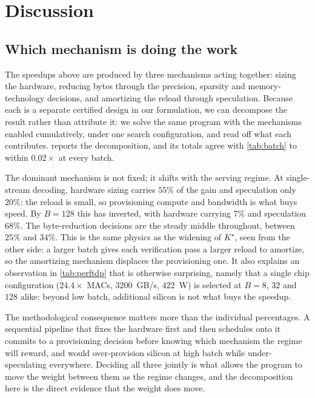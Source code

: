 \section{Discussion}
\label{sec:discussion}

\subsection{Which mechanism is doing the work}
\label{sec:mechanism_shift}

The speedups above are produced by three mechanisms acting together: sizing the
hardware, reducing bytes through the precision, sparsity and memory-technology
decisions, and amortizing the reload through speculation. Because each is a
separate certified design in our formulation, we can decompose the result rather
than attribute it: we solve the same program with the mechanisms enabled
cumulatively, under one search configuration, and read off what each contributes.
 reports the decomposition, and its totals agree with
\cref{tab:batch} to within $0.02\times$ at every batch.

The dominant mechanism is not fixed; it shifts with the serving regime. At
single-stream decoding, hardware sizing carries $55\%$ of the gain and
speculation only $20\%$: the reload is small, so provisioning compute and
bandwidth is what buys speed. By $B=128$ this has inverted, with hardware
carrying $7\%$ and speculation $68\%$. The byte-reduction decisions are the steady middle
throughout, between $25\%$ and $34\%$. This is the same physics as the widening
of $K^\star$, seen from the other side: a larger batch gives each verification
pass a larger reload to amortize, so the amortizing mechanism displaces the
provisioning one. It also explains an observation in \cref{tab:perftdp} that is
otherwise surprising, namely that a single chip configuration
($24.4\times$ MACs, $3200$~GB/s, $422$~W) is selected at $B=8$, $32$ and $128$
alike: beyond low batch, additional silicon is not what buys the speedup.

The methodological consequence matters more than the individual percentages. A
sequential pipeline that fixes the hardware first and then schedules onto it
commits to a provisioning decision before knowing which mechanism the regime
will reward, and would over-provision silicon at high batch while
under-speculating everywhere. Deciding all three jointly is what allows the
program to move the weight between them as the regime changes, and the
decomposition here is the direct evidence that the weight does move.

